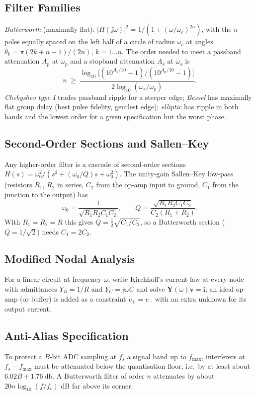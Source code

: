 \documentclass[11pt,a4paper]{article}
\begin{document}
\subsection{Filter Families}
\emph{Butterworth} (maximally flat): $|H(\jj\omega)|^2=1/(1+(\omega/\omega_c)^{2n})$, with the $n$ poles equally spaced on the left half of a circle of radius $\omega_c$ at angles $\theta_k=\pi(2k+n-1)/(2n)$, $k=1\dots n$. The order needed to meet a passband attenuation $A_p$ at $\omega_p$ and a stopband attenuation $A_s$ at $\omega_s$ is
\begin{equation}
  n\ \ge\ \frac{\log_{10}\!\big[(10^{A_s/10}-1)/(10^{A_p/10}-1)\big]}{2\log_{10}(\omega_s/\omega_p)}.
  \label{eq:buttord}
\end{equation}
\emph{Chebyshev type I} trades passband ripple for a steeper edge; \emph{Bessel} has maximally flat group delay (best pulse fidelity, gentlest edge); \emph{elliptic} has ripple in both bands and the lowest order for a given specification but the worst phase.

\subsection{Second-Order Sections and Sallen--Key}
Any higher-order filter is a cascade of second-order sections $H(s)=\omega_0^2/(s^2+(\omega_0/Q)s+\omega_0^2)$. The unity-gain Sallen--Key low-pass (resistors $R_1$, $R_2$ in series, $C_2$ from the op-amp input to ground, $C_1$ from the junction to the output) has
\begin{equation}
  \omega_0=\frac1{\sqrt{R_1R_2C_1C_2}},\qquad Q=\frac{\sqrt{R_1R_2C_1C_2}}{C_2(R_1+R_2)}.
  \label{eq:sk}
\end{equation}
With $R_1=R_2=R$ this gives $Q=\tfrac12\sqrt{C_1/C_2}$, so a Butterworth section ($Q=1/\sqrt2$) needs $C_1=2C_2$.

\subsection{Modified Nodal Analysis}
For a linear circuit at frequency $\omega$, write Kirchhoff's current law at every node with admittances $Y_R=1/R$ and $Y_C=\jj\omega C$ and solve $\mathbf Y(\omega)\mathbf v=\mathbf i$; an ideal op-amp (or buffer) is added as a constraint $v_+=v_-$ with an extra unknown for its output current.

\subsection{Anti-Alias Specification}
To protect a $B$-bit ADC sampling at $f_s$ a signal band up to $f_{\max}$, interferers at $f_s-f_{\max}$ must be attenuated below the quantisation floor, i.e.\ by at least about $6.02B+1.76\ \si{\decibel}$. A Butterworth filter of order $n$ attenuates by about $20n\log_{10}(f/f_c)$ dB far above its corner.
\end{document}
